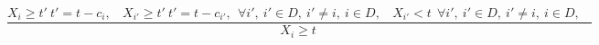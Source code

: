 $$\frac{X_{i} \geq t'~t'=t-c_{i},~~~~X_{i'} \geq t'~t'=t-c_{i'},~~\forall i',~i' \in D,~i' \neq i,~i \in D,~~~~X_{i'}<t~~\forall i',~i' \in D,~i' \neq i,~i \in D,~~~~}{X_{i} \geq t~}$$ 